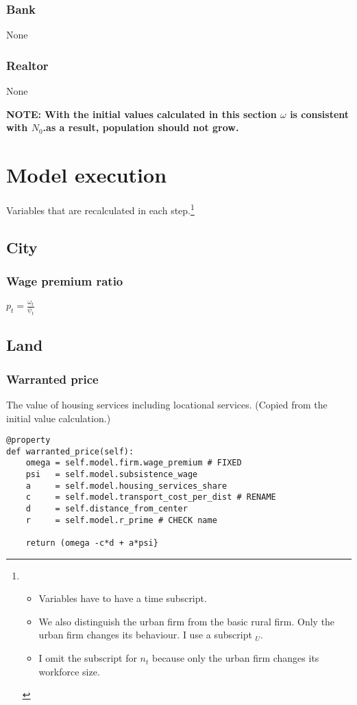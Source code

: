 \subsubsection{Bank}
\begin{description}
\item[None] 
\end{description}

\subsubsection{Realtor}
\begin{description}
\item[None] 
\end{description}


\textbf{NOTE: With the initial values calculated in this section $\omega$ is consistent with $N_0$.as a result, population should not grow. }





\section{Model execution}
Variables that are recalculated in each step.\footnote{\begin{itemize}
    \item Variables have to have a time subscript. 
    \item We also distinguish the urban firm from the basic rural firm.  Only the urban firm changes its behaviour.  I use a subscript $_U$. 
    \item I omit the subscript for $n_t$ because only the urban firm changes its workforce size.
\end{itemize} }


\subsection{City}
\subsubsection{Wage premium ratio}

$p_t= \frac{\omega_t}{\psi_t}$ 


    \subsection{Land}
\subsubsection{Warranted price} The value of housing services including locational services. (Copied from the initial value calculation.)
\begin{lstlisting}
@property
def warranted_price(self):
    omega = self.model.firm.wage_premium # FIXED
    psi   = self.model.subsistence_wage
    a     = self.model.housing_services_share
    c     = self.model.transport_cost_per_dist # RENAME
    d     = self.distance_from_center
    r     = self.model.r_prime # CHECK name
  
    return (omega -c*d + a*psi}
\end{lstlisting}


